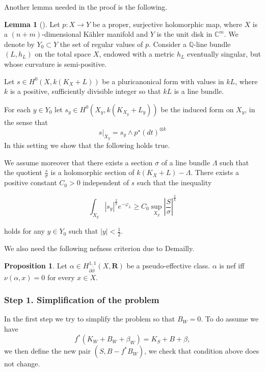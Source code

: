\documentclass[11pt]{article}
\theoremstyle{definition}
\newtheorem{lemma}[theorem]{Lemma}
\newtheorem{proposition}[theorem]{Proposition}
\begin{document}
	Another lemma needed in the proof is the following.
	
	
	
	
	
	\begin{lemma}[{\cite[Lemma 7.1]{HP24}}]
		Let $p: X \rightarrow Y$ be a proper, surjective holomorphic map, where $X$ is a $(n+m)$-dimensional Kähler manifold and $Y$ is the unit disk in $\mathbb{C}^m$. We denote by $Y_0 \subset Y$ the set of regular values of $p$. Consider a $\mathbb{Q}$-line bundle $\left(L, h_L\right)$ on the total space $X$, endowed with a metric $h_L$ eventually singular, but whose curvature is semi-positive. 
		
		Let $s \in H^0\left(X, k\left(K_X+L\right)\right)$ be a pluricanonical form with values in $k L$, where $k$ is a positive, sufficiently divisible integer so that $k L$ is a line bundle. 
		
		For each $y \in Y_0$ let $s_y \in H^0\left(X_y, k\left(K_{X_y}+L_y\right)\right)$ be the induced form on $X_y$, in the sense that
		$$
		\left.s\right|_{X_y}=s_y \wedge p^{\star}(d t)^{\otimes k}
		$$
		In this setting we show that the following holds true.
		
		We assume moreover that there exists a section $\sigma$ of a line bundle $\Lambda$ such that the quotient $\frac{s}{\sigma}$ is a holomorphic section of $k\left(K_X+L\right)-\Lambda$. There exists a positive constant $C_0>0$ independent of $s$ such that the inequality
		
		$$
		\int_{X_y}\left|s_y\right|^{\frac{2}{k}} e^{-\varphi_L} \geq C_0 \sup _{X_y}\left|\frac{S}{\sigma}\right|^{\frac{2}{k}}
		$$
		
		holds for any $y \in Y_0$ such that $|y|<\frac{1}{2}$. 
	\end{lemma}
	
	We also need the following nefness criterion due to Demailly.
	
	
	\begin{proposition}
		Let $\alpha \in H_{\partial \bar{\partial}}^{1,1}(X, \mathbf{R})$ be a pseudo-effective class. $\alpha$ is nef iff $\nu(\alpha, x)=0$ for every $x \in X$.
	\end{proposition}
	\subsubsection{Step 1. Simplification of the problem}
	In the first step we try to simplify the problem so that $B_W = 0$. To do assume we have $$f^*(K_W+B_W + \beta_W) = K_{S}+B+ \beta,$$we then define the new pair $(S, B -f^*B_W)$, we check that condition above does not change. 
	
\end{document}

